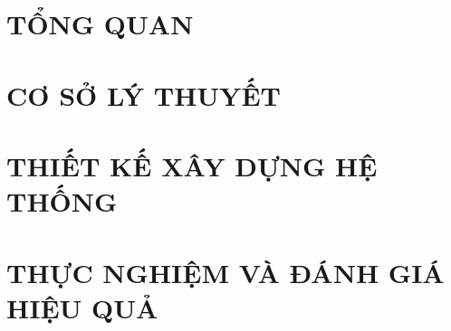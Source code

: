 \documentclass[a4paper,13pt,3p,twoside]{report}
\renewcommand{\headrulewidth}{0pt}
\theoremstyle{definition}
\begin{document}
\pagestyle{plain}
\renewcommand{\listtablename}{DANH MỤC BẢNG BIỂU}
{\let\oldnumberline\numberline
\renewcommand{\numberline}{Bảng~\oldnumberline}
\listoftables}
\thispagestyle{plain}






\newpage
{}

\pagestyle{fancy}
\fancyhf{}
\renewcommand{\headrulewidth}{0.4pt}
\setlength{\headheight}{14pt}
\makeatletter
\renewcommand{\chaptermark}[1]{\markboth{CHƯƠNG \thechapter.\ #1}{}}
\makeatother
\fancyhead[LO]{\nouppercase{\leftmark}}
\fancyhead[RE]{\nouppercase{\leftmark}}
\fancyfoot[RO]{\thepage}
\renewcommand{\sectionmark}[1]{}

\chapter{TỔNG QUAN}
\label{chuong1}

\newpage
\chapter{CƠ SỞ LÝ THUYẾT}
\label{chuong2}


\newpage
\chapter{THIẾT KẾ XÂY DỰNG HỆ THỐNG}
\label{chuong3}


\newpage
\chapter{THỰC NGHIỆM VÀ ĐÁNH GIÁ HIỆU QUẢ}
\label{chuong4}

\end{document}
